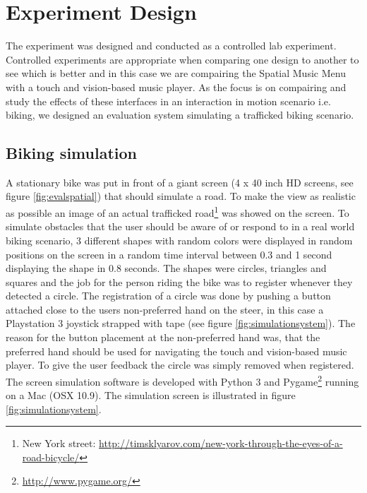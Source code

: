 \section{Experiment Design}
The experiment was designed and conducted as a controlled lab experiment. Controlled experiments are appropriate when comparing one design to another to see which is better \cite{benyon_designing_2010} and in this case we are compairing the Spatial Music Menu with a touch and vision-based music player. As the focus is on compairing and study the effects of these interfaces in an interaction in motion scenario i.e. biking, we designed an evaluation system simulating a trafficked biking scenario.

\subsection{Biking simulation}
A stationary bike was put in front of a giant screen (4 x 40 inch HD screens, see figure \ref{fig:evalspatial}) that should simulate a road. To make the view as realistic as possible an image of an actual trafficked road\footnote{New York street: \url{http://timsklyarov.com/new-york-through-the-eyes-of-a-road-bicycle/}} was showed on the screen. To simulate obstacles that the user should be aware of or respond to in a real world biking scenario, 3 different shapes with random colors were displayed in random positions on the screen in a random time interval between 0.3 and 1 second displaying the shape in 0.8 seconds. The shapes were circles, triangles and squares and the job for the person riding the bike was to register whenever they detected a circle. The registration of a circle was done by pushing a button attached close to the users non-preferred hand on the steer, in this case a Playstation 3 joystick strapped with tape (see figure \ref{fig:simulationsystem}). The reason for the button placement at the non-preferred hand was, that the preferred hand should be used for navigating the touch and vision-based music player. To give the user feedback the circle was simply removed when registered. The screen simulation software is developed with Python 3 and Pygame\footnote{\url{http://www.pygame.org/}} running on a Mac (OSX 10.9). The simulation screen is illustrated in figure \ref{fig:simulationsystem}.

